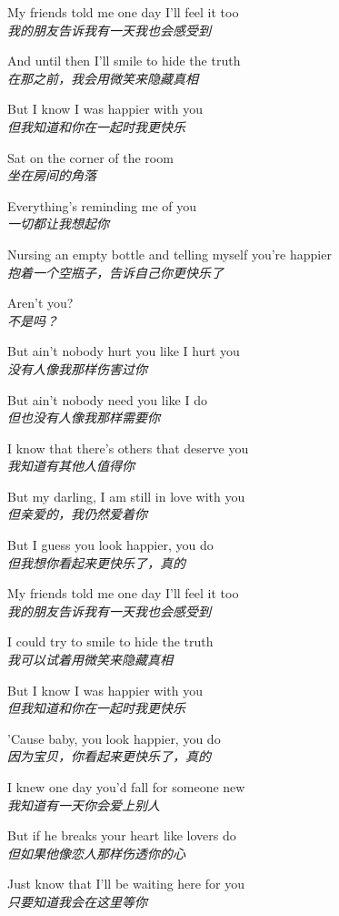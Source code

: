 \begin{spacing}{1.5}
\begin{flushleft}
My friends told me one day I'll feel it too\\
\textit{我的朋友告诉我有一天我也会感受到}\lyricspace

And until then I'll smile to hide the truth\\
\textit{在那之前，我会用微笑来隐藏真相}\lyricspace

But I know I was happier with you\\
\textit{但我知道和你在一起时我更快乐}\lyricspace

Sat on the corner of the room\\
\textit{坐在房间的角落}\lyricspace

Everything's reminding me of you\\
\textit{一切都让我想起你}\lyricspace

Nursing an empty bottle and telling myself you're happier\\
\textit{抱着一个空瓶子，告诉自己你更快乐了}\lyricspace

Aren't you?\\
\textit{不是吗？}\lyricspace

But ain't nobody hurt you like I hurt you\\
\textit{没有人像我那样伤害过你}\lyricspace

But ain't nobody need you like I do\\
\textit{但也没有人像我那样需要你}\lyricspace

I know that there's others that deserve you\\
\textit{我知道有其他人值得你}\lyricspace

But my darling, I am still in love with you\\
\textit{但亲爱的，我仍然爱着你}\lyricspace

But I guess you look happier, you do\\
\textit{但我想你看起来更快乐了，真的}\lyricspace

My friends told me one day I'll feel it too\\
\textit{我的朋友告诉我有一天我也会感受到}\lyricspace

I could try to smile to hide the truth\\
\textit{我可以试着用微笑来隐藏真相}\lyricspace

But I know I was happier with you\\
\textit{但我知道和你在一起时我更快乐}\lyricspace

'Cause baby, you look happier, you do\\
\textit{因为宝贝，你看起来更快乐了，真的}\lyricspace

I knew one day you'd fall for someone new\\
\textit{我知道有一天你会爱上别人}\lyricspace

But if he breaks your heart like lovers do\\
\textit{但如果他像恋人那样伤透你的心}\lyricspace

Just know that I'll be waiting here for you\\
\textit{只要知道我会在这里等你}\lyricspace
\end{flushleft}
\end{spacing} 
